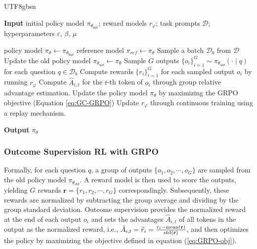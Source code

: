 \documentclass[11pt, a4paper, logo, copyright, nonumbering]{deepseek}
\renewcommand{\phi}{\varphi}
\renewcommand{\epsilon}{\varepsilon}
\begin{document}
\begin{CJK*}{UTF8}{gbsn}
\begin{algorithm}[t]
  \small
  \caption{Iterative Group Relative Policy Optimization}
  \textbf{Input} initial policy model $\pi_{\theta_{\text{init}}}$; reward models $r_\phi$; task prompts $\mathcal{D}$; 
  hyperparameters $\epsilon$, $\beta$, $\mu$
  \begin{algorithmic}[1]
    \State policy model $\pi_\theta \leftarrow \pi_{\theta_{\text{init}}}$
       \State reference model $\pi_{ref} \leftarrow \pi_{\theta}$
      \State Sample a batch $\mathcal{D}_b$ from $\mathcal{D}$
      \State Update the old policy model $\pi_{\theta_{old}} \leftarrow \pi_{\theta}$ 
      \State Sample $G$ outputs $\{o_i\}_{i=1}^G \sim \pi_{\theta_{old}} (\cdot \mid q) $ for each question $q \in \mathcal{D}_b$
      \State Compute rewards $\{r_i\}_{i=1}^{G}$ for each sampled output $o_i$ by running $r_{\phi}$ 
      \State Compute $\hat{A}_{i,t}$ for the $t$-th token of $o_i$ through group relative advantage estimation.
        \State Update the policy model $\pi_{\theta}$ by maximizing the GRPO objective (Equation \ref{eq:GC-GRPO})
      \EndFor
    \EndFor 
    \State Update $r_\phi$ through continuous training using a replay mechanism. 
    \EndFor 
  \end{algorithmic}
  \textbf{Output} $\pi_\theta$
  \label{alg:iter-grpo}
\end{algorithm}
\subsubsection{Outcome Supervision RL with GRPO} 
Formally, for each question $q$,  a group of outputs $\{o_1, o_2, \cdots, o_G\}$  are sampled from the old policy model $\pi_{\theta_{old}}$. A reward model is then used to score the outputs, yielding $G$ rewards  $\mathbf{r}=\{r_1, r_2, \cdots, r_G\}$ correspondingly. Subsequently, these rewards are normalized by subtracting the group average and dividing by the group standard deviation. Outcome supervision provides the normalized reward at the end of each output $o_i$  and sets the advantages  $\hat{A}_{i, t}$  of all tokens in the output as the normalized reward, i.e., $\hat{A}_{i, t} = \widetilde{r}_i = \frac{r_i- {\rm mean}(\mathbf{r})}{{\rm std}(\mathbf{r})}$, and then optimizes the policy by maximizing the objective defined in equation (\ref{eq:GRPO-obj}).


\end{CJK*}
\end{document}
